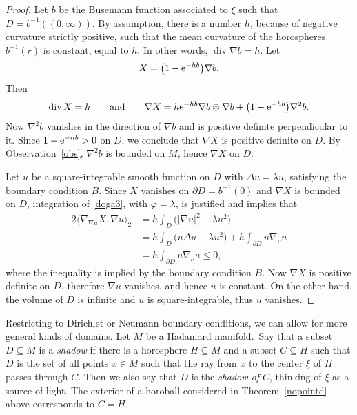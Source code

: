 \documentclass[10pt,a4paper]{amsart}
\numberwithin{equation}{section}
\DeclareMathOperator{\diver}{div}
\def\vf{\varphi}
\begin{document}
\begin{proof}
Let $b$ be the Busemann function associated to $\xi$ such that $D =b^{-1}((0,\infty))$.
By assumption, there is a number $h$, because of negative curvature strictly positive,
such that the mean curvature of the horospheres $b^{-1}(r)$ is constant, equal to $h$.
In other words, $\diver\nabla b=h$.
Let
\begin{align}\label{nopointd2}
X = \bigl(1 - {\rm e}^{-hb}\bigr)\nabla b.
\end{align}
Then
\begin{align*}%
 \diver X=h \qquad\text{and}\qquad
 \nabla X = h{\rm e}^{-hb} \nabla b\otimes\nabla b + \bigl(1 - {\rm e}^{-hb}\bigr)\nabla^2b.
\end{align*}
Now $\nabla^2b$ vanishes in the direction of $\nabla b$ and is positive definite perpendicular to it.
Since $1-{\rm e}^{-hb}>0$ on $D$, we conclude that $\nabla X$ is positive definite on $D$.
By Observation~\ref{obs}, $\nabla^2b$ is bounded on $M$, hence $\nabla X$ on $D$.

Let $u$ be a square-integrable smooth function on $D $ with $\Delta u=\lambda u$,
satisfying the boundary condition $B$.
Since $X$ vanishes on $\partial D=b^{-1}(0)$ and $\nabla X$ is bounded on $D$,
integration of \eqref{doga3}, with $\vf=\lambda$, is justified and implies that
\begin{align}
 2\langle\nabla_{\nabla u}X,\nabla u\rangle_2
 &= h\int_D \bigl(|\nabla u|^2 - \lambda u^2\bigr) \nonumber\\
 &= h\int_D \bigl(u\Delta u - \lambda u^2\bigr) + h\int_{\partial D }u\nabla_\nu u \nonumber\\
 &= h\int_{\partial D }u\nabla_\nu u \le 0,\label{nopointd6}
\end{align}
where the inequality is implied by the boundary condition $B$.
Now $\nabla X$ is positive definite on $D $, therefore $\nabla u$ vanishes, and hence $u$ is constant.
On the other hand, the volume of $D $ is infinite and $u$ is square-integrable, thus $u$ vanishes.
\end{proof}

Restricting to Dirichlet or Neumann boundary conditions, we can allow for more general kinds of domains.
Let $M$ be a Hadamard manifold.\
Say that a subset $D\subseteq M$ is a \emph{shadow} if there is a horosphere $H\subseteq M$
and a subset $C\subseteq H$ such that $D$ is the set of all points $x\in M$
such that the ray from $x$ to the center $\xi$ of $H$ passes through $C$.
Then we also say that $D$ is the \emph{shadow of $C$}, thinking of $\xi$ as a source of light.
The exterior of a horoball considered in Theorem~\ref{nopointd} above corresponds to $C=H$.
\end{document}
